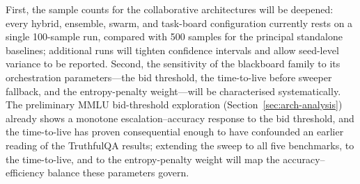 First, the sample counts for the collaborative architectures will be deepened: every hybrid, ensemble, swarm, and task-board configuration currently rests on a single 100-sample run, compared with 500 samples for the principal standalone baselines; additional runs will tighten confidence intervals and allow seed-level variance to be reported. Second, the sensitivity of the blackboard family to its orchestration parameters---the bid threshold, the time-to-live before sweeper fallback, and the entropy-penalty weight---will be characterised systematically. The preliminary MMLU bid-threshold exploration (Section~\ref{sec:arch-analysis}) already shows a monotone escalation--accuracy response to the bid threshold, and the time-to-live has proven consequential enough to have confounded an earlier reading of the TruthfulQA results; extending the sweep to all five benchmarks, to the time-to-live, and to the entropy-penalty weight will map the accuracy--efficiency balance these parameters govern.
